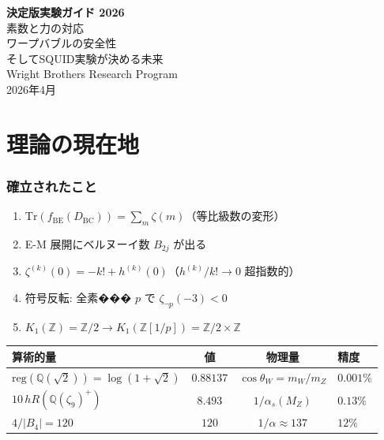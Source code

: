 \documentclass[12pt,a4paper]{article}
\begin{document}
\begin{center}
{\Huge\bfseries 決定版実験ガイド 2026}\\[0.8cm]
{\Large 素数と力の対応}\\[0.2cm]
{\Large ワープバブルの安全性}\\[0.2cm]
{\Large そしてSQUID実験が決める未来}\\[1cm]
{\large Wright Brothers Research Program}\\[0.3cm]
{2026年4月}
\end{center}

\vspace{0.5cm}
\tableofcontents
\newpage

\part{理論の現在地}

\section{確立されたこと}

\begin{resultbox}
\begin{enumerate}
\item $\mathrm{Tr}(f_{\mathrm{BE}}(D_{\mathrm{BC}})) = \sum_m \zeta(m)$（等比級数の変形）
\item E-M 展開にベルヌーイ数 $B_{2j}$ が出る
\item $\zeta^{(k)}(0) = -k! + h^{(k)}(0)$（$h^{(k)}/k! \to 0$ 超指数的）
\item 符号反転: 全素��� $p$ で $\zeta_{\neg p}(-3) < 0$
\item $K_1(\mathbb{Z}) = \mathbb{Z}/2 \to K_1(\mathbb{Z}[1/p]) = \mathbb{Z}/2 \times \mathbb{Z}$
\end{enumerate}
\end{resultbox}

\begin{resultbox}
\begin{center}
\renewcommand{\arraystretch}{1.3}
\begin{tabular}{lccl}
\toprule
算術的量 & 値 & 物理量 & 精度 \\
\midrule
$\mathrm{reg}(\mathbb{Q}(\sqrt{2})) = \log(1+\sqrt{2})$ & $0.88137$ & $\cos\theta_W = m_W/m_Z$ & $0.001\%$ \\
$10\,hR(\mathbb{Q}(\zeta_9)^+)$ & $8.493$ & $1/\alpha_s(M_Z)$ & $0.13\%$ \\
$4/|B_4| = 120$ & $120$ & $1/\alpha \approx 137$ & $12\%$ \\
\bottomrule
\end{tabular}
\end{center}
\end{resultbox}
\end{document}

